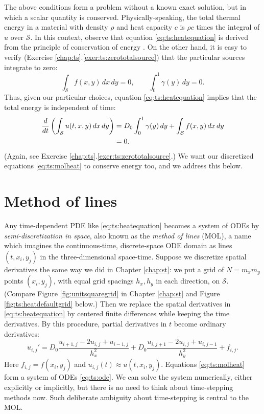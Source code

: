 The above conditions form a problem without a known exact solution, but in which a scalar quantity is conserved.  Physically-speaking, the total thermal energy in a material with density $\rho$ and heat capacity $c$ is $\rho c$ times the integral of $u$ over $\mathcal{S}$.  In this context, observe that equation \eqref{eq:ts:heatequation} is derived from the principle of conservation of energy \citep{Ockendonetal2003}.  On the other hand, it is easy to verify (Exercise \ref{chap:ts}.\ref{exer:ts:zerototalsource}) that the particular sources integrate to zero:
\begin{equation}
\int_{\mathcal{S}} f(x,y)\,dx\,dy = 0, \qquad \int_0^1 \gamma(y)\,dy = 0. \label{eq:ts:zerototalsource}
\end{equation}
Thus, given our particular choices, equation \eqref{eq:ts:heatequation} implies that the total energy is independent of time:
\begin{align}
\frac{d}{dt} \left(\int_{\mathcal{S}} u(t,x,y)\,dx\,dy\right) &= D_0 \int_0^1 \gamma(y)\,dy + \int_{\mathcal{S}} f(x,y)\,dx\,dy \label{eq:ts:conservedscalar} \\
   &= 0. \notag
\end{align}
(Again, see Exercise \ref{chap:ts}.\ref{exer:ts:zerototalsource}.)  We want our discretized equations \eqref{eq:ts:molheat} to conserve energy too, and we address this below.


\section{Method of lines}  Any time-dependent PDE like \eqref{eq:ts:heatequation} becomes a system of ODEs by \emph{semi-discretization in space}, also known as the \emph{method of lines} (MOL), a name which imagines the continuous-time, discrete-space ODE domain as lines $(t,x_i,y_j)$ in the three-dimensional space-time.  Suppose we discretize spatial derivatives the same way we did in Chapter \ref{chap:st}: we put a grid of $N = m_x m_y$ points $(x_i,y_j)$, with equal grid spacings $h_x,h_y$ in each direction, on $\mathcal{S}$.  (Compare Figure \ref{fig:unitsquaregrid} in Chapter \ref{chap:st} and Figure \ref{fig:ts:heatdefaultgrid} below.)  Then we replace the spatial derivatives in \eqref{eq:ts:heatequation} by centered finite differences while keeping the time derivatives.  By this procedure, partial derivatives in $t$ become ordinary derivatives:
\begin{equation}
u_{i,j}' = D_0 \frac{u_{i+1,j} - 2 u_{i,j} + u_{i-1,j}}{h_x^2} + D_0 \frac{u_{i,j+1} - 2 u_{i,j} + u_{i,j-1}}{h_y^2} + f_{i,j}. \label{eq:ts:molheat}
\end{equation}
Here $f_{i,j} = f(x_i,y_j)$ and $u_{i,j}(t) \approx u(t,x_i,y_j)$.  Equations \eqref{eq:ts:molheat} form a system of ODEs \eqref{eq:ts:ode}.  We can solve the system numerically, either explicitly or implicitly, but there is no need to think about time-stepping methods now.  Such deliberate ambiguity about time-stepping is central to the MOL.


